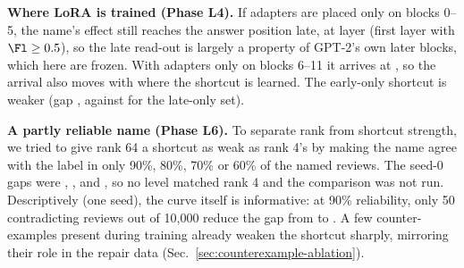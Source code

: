\textbf{Where LoRA is trained (Phase L4).} If adapters are placed only on blocks 0--5, the name's effect still reaches
the answer position late, at layer \lFourArrivalEarly{} (first layer with $\Fl \ge 0.5$), so the late read-out is largely
a property of GPT-2's own later blocks, which here are frozen. With adapters only on blocks 6--11 it arrives at
\lFourArrivalLate, so the arrival also moves with where the shortcut is learned. The early-only shortcut is weaker
(gap \lFourGapEarly, against \lFourGapLate{} for the late-only set).

\textbf{A partly reliable name (Phase L6).} To separate rank from shortcut strength, we tried to give rank 64 a
shortcut as weak as rank 4's by making the name agree with the label in only 90\%, 80\%, 70\% or 60\% of the named
reviews. The seed-0 gaps were \lSixGapPNinetysZero, \lSixGapPEightysZero, \lSixGapPSeventysZero{} and
\lSixGapPSixtysZero, so no level matched rank 4 and the comparison was not run. Descriptively (one seed), the curve
itself is informative: at 90\% reliability, only 50 contradicting reviews out of 10{,}000 reduce the gap from
\gapLoraRSixtyFoursZero{} to \lSixGapPNinetysZero. A few counter-examples present during training already weaken the shortcut
sharply, mirroring their role in the repair data (Sec.~\ref{sec:counterexample-ablation}).
